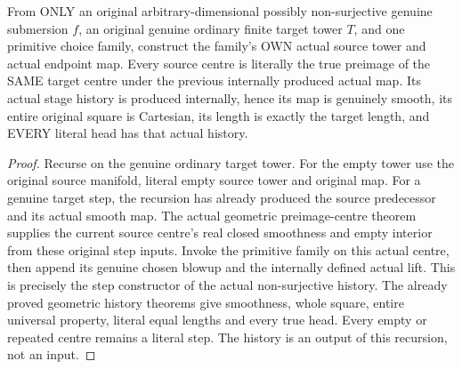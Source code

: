 \begin{theorem}
\label{hir:submersion-cartesian-choice-actual-production}
\leanok
{}
From ONLY an original arbitrary-dimensional possibly non-surjective genuine
submersion $f$, an original genuine ordinary finite target tower $T$, and
one primitive choice family, construct the family's OWN actual source
tower and actual endpoint map. Every source centre is literally the true
preimage of the SAME target centre under the previous internally produced
actual map. Its actual stage history is produced internally, hence its map
is genuinely smooth, its entire original square is Cartesian, its length
is exactly the target length, and EVERY literal head has that actual history.
\end{theorem}
\begin{proof}
Recurse on the genuine ordinary target tower. For the empty tower use the
original source manifold, literal empty source tower and original map.
For a genuine target step, the recursion has already produced the source
predecessor and its actual smooth map. The actual geometric preimage-centre
theorem supplies the current source centre's real closed smoothness and
empty interior from these original step inputs. Invoke the primitive
family on this actual centre, then append its genuine chosen blowup and
the internally defined actual lift. This is precisely the step constructor
of the actual non-surjective history. The already proved geometric history
theorems give smoothness, whole square, entire universal property, literal
equal lengths and every true head. Every empty or repeated centre remains
a literal step. The history is an output of this recursion, not an input.
\end{proof}

